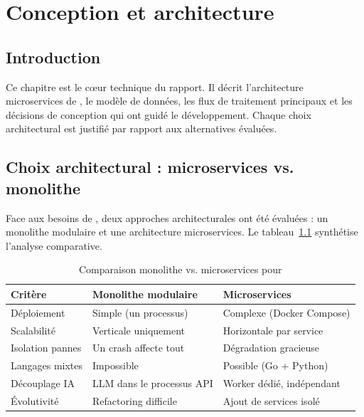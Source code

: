 \chapter{Conception et architecture}

\section*{Introduction}

Ce chapitre est le cœur technique du rapport. Il décrit l'architecture
microservices de \caimp{}, le modèle de données, les flux de traitement principaux
et les décisions de conception qui ont guidé le développement. Chaque choix
architectural est justifié par rapport aux alternatives évaluées.

\section{Choix architectural : microservices vs. monolithe}

Face aux besoins de \caimp{}, deux approches architecturales ont été évaluées :
un monolithe modulaire et une architecture microservices. Le tableau~\ref{tab:arch-choice}
synthétise l'analyse comparative.

\begin{table}[H]
\centering
\caption{Comparaison monolithe vs. microservices pour \caimp{}}
\label{tab:arch-choice}
\small
\begin{tabularx}{\textwidth}{lXX}
\toprule
\textbf{Critère} & \textbf{Monolithe modulaire} & \textbf{Microservices} \\
\midrule
Déploiement       & Simple (un processus)         & Complexe (Docker Compose) \\
Scalabilité       & Verticale uniquement          & Horizontale par service \\
Isolation pannes  & Un crash affecte tout         & Dégradation gracieuse \\
Langages mixtes   & Impossible                    & Possible (Go + Python) \\
Découplage IA     & LLM dans le processus API     & Worker dédié, indépendant \\
Évolutivité       & Refactoring difficile         & Ajout de services isolé \\
\bottomrule
\end{tabularx}
\end{table}

